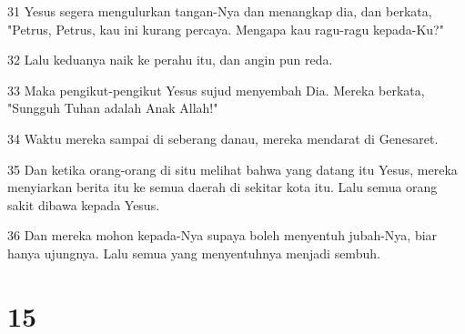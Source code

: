 \par 31 Yesus segera mengulurkan tangan-Nya dan menangkap dia, dan berkata, "Petrus, Petrus, kau ini kurang percaya. Mengapa kau ragu-ragu kepada-Ku?"
\par 32 Lalu keduanya naik ke perahu itu, dan angin pun reda.
\par 33 Maka pengikut-pengikut Yesus sujud menyembah Dia. Mereka berkata, "Sungguh Tuhan adalah Anak Allah!"
\par 34 Waktu mereka sampai di seberang danau, mereka mendarat di Genesaret.
\par 35 Dan ketika orang-orang di situ melihat bahwa yang datang itu Yesus, mereka menyiarkan berita itu ke semua daerah di sekitar kota itu. Lalu semua orang sakit dibawa kepada Yesus.
\par 36 Dan mereka mohon kepada-Nya supaya boleh menyentuh jubah-Nya, biar hanya ujungnya. Lalu semua yang menyentuhnya menjadi sembuh.

\chapter{15}


